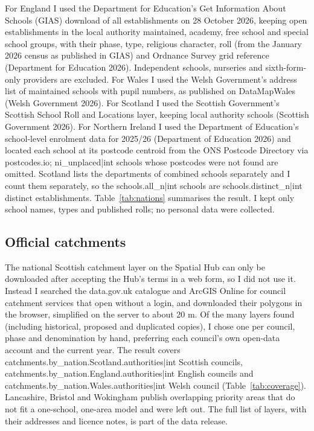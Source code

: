 \documentclass[11pt,a4paper]{article}
\begin{document}
For England I used the Department for Education's Get Information About Schools (GIAS) download of all establishments on 28 October 2026, keeping open establishments in the local authority maintained, academy, free school and special school groups, with their phase, type, religious character, roll (from the January 2026 census as published in GIAS) and Ordnance Survey grid reference (Department for Education 2026). Independent schools, nurseries and sixth-form-only providers are excluded. For Wales I used the Welsh Government's address list of maintained schools with pupil numbers, as published on DataMapWales (Welsh Government 2026). For Scotland I used the Scottish Government's Scottish School Roll and Locations layer, keeping local authority schools (Scottish Government 2026). For Northern Ireland I used the Department of Education's school-level enrolment data for 2025/26 (Department of Education 2026) and located each school at its postcode centroid from the ONS Postcode Directory via postcodes.io; {{ni_unplaced|int}} schools whose postcodes were not found are omitted. Scotland lists the departments of combined schools separately and I count them separately, so the {{schools.all_n|int}} schools are {{schools.distinct_n|int}} distinct establishments. Table~\ref{tab:nations} summarises the result. I kept only school names, types and published rolls; no personal data were collected.

\TABNATIONS

\subsection{Official catchments}

The national Scottish catchment layer on the Spatial Hub can only be downloaded after accepting the Hub's terms in a web form, so I did not use it. Instead I searched the data.gov.uk catalogue and ArcGIS Online for council catchment services that open without a login, and downloaded their polygons in the browser, simplified on the server to about 20 m. Of the many layers found (including historical, proposed and duplicated copies), I chose one per council, phase and denomination by hand, preferring each council's own open-data account and the current year. The result covers {{catchments.by_nation.Scotland.authorities|int}} Scottish councils, {{catchments.by_nation.England.authorities|int}} English councils and {{catchments.by_nation.Wales.authorities|int}} Welsh council (Table~\ref{tab:coverage}). Lancashire, Bristol and Wokingham publish overlapping priority areas that do not fit a one-school, one-area model and were left out. The full list of layers, with their addresses and licence notes, is part of the data release.
\end{document}
